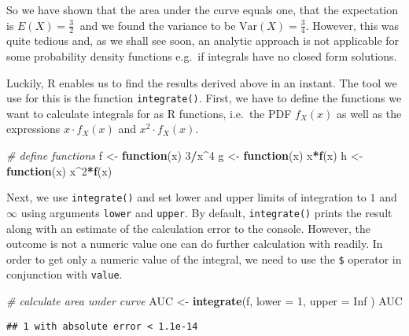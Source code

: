 \documentclass[]{book}
\newenvironment{Shaded}{\begin{snugshade}}{\end{snugshade}}
\newcommand{\KeywordTok}[1]{\textcolor[rgb]{0.13,0.29,0.53}{\textbf{#1}}}
\newcommand{\DataTypeTok}[1]{\textcolor[rgb]{0.13,0.29,0.53}{#1}}
\newcommand{\DecValTok}[1]{\textcolor[rgb]{0.00,0.00,0.81}{#1}}
\newcommand{\StringTok}[1]{\textcolor[rgb]{0.31,0.60,0.02}{#1}}
\newcommand{\CommentTok}[1]{\textcolor[rgb]{0.56,0.35,0.01}{\textit{#1}}}
\newcommand{\OtherTok}[1]{\textcolor[rgb]{0.56,0.35,0.01}{#1}}
\newcommand{\ControlFlowTok}[1]{\textcolor[rgb]{0.13,0.29,0.53}{\textbf{#1}}}
\newcommand{\OperatorTok}[1]{\textcolor[rgb]{0.81,0.36,0.00}{\textbf{#1}}}
\newcommand{\NormalTok}[1]{#1}
\theoremstyle{definition}
\theoremstyle{definition}
\theoremstyle{definition}
\theoremstyle{remark}
\begin{document}
So we have shown that the area under the curve equals one, that the
expectation is \(E(X)=\frac{3}{2} \ \) and we found the variance to be
\(\text{Var}(X) = \frac{3}{4}\). However, this was quite tedious and, as
we shall see soon, an analytic approach is not applicable for some
probability density functions e.g.~if integrals have no closed form
solutions.

Luckily, R enables us to find the results derived above in an instant.
The tool we use for this is the function \texttt{integrate()}. First, we
have to define the functions we want to calculate integrals for as R
functions, i.e.~the PDF \(f_X(x)\) as well as the expressions
\(x\cdot f_X(x)\) and \(x^2\cdot f_X(x)\).

\begin{Shaded}
\begin{Highlighting}[]
\CommentTok{# define functions}
\NormalTok{f <-}\StringTok{ }\ControlFlowTok{function}\NormalTok{(x) }\DecValTok{3}\OperatorTok{/}\NormalTok{x}\OperatorTok{^}\DecValTok{4}
\NormalTok{g <-}\StringTok{ }\ControlFlowTok{function}\NormalTok{(x) x}\OperatorTok{*}\KeywordTok{f}\NormalTok{(x)}
\NormalTok{h <-}\StringTok{ }\ControlFlowTok{function}\NormalTok{(x) x}\OperatorTok{^}\DecValTok{2}\OperatorTok{*}\KeywordTok{f}\NormalTok{(x)}
\end{Highlighting}
\end{Shaded}

Next, we use \texttt{integrate()} and set lower and upper limits of
integration to \(1\) and \(\infty\) using arguments \texttt{lower} and
\texttt{upper}. By default, \texttt{integrate()} prints the result along
with an estimate of the calculation error to the console. However, the
outcome is not a numeric value one can do further calculation with
readily. In order to get only a numeric value of the integral, we need
to use the \texttt{\$} operator in conjunction with \texttt{value}.

\begin{Shaded}
\begin{Highlighting}[]
\CommentTok{# calculate area under curve}
\NormalTok{AUC <-}\StringTok{ }\KeywordTok{integrate}\NormalTok{(f, }
                 \DataTypeTok{lower =} \DecValTok{1}\NormalTok{, }
                 \DataTypeTok{upper =} \OtherTok{Inf}
\NormalTok{                 )}
\NormalTok{AUC }
\end{Highlighting}
\end{Shaded}

\begin{verbatim}
## 1 with absolute error < 1.1e-14
\end{verbatim}
\end{document}
